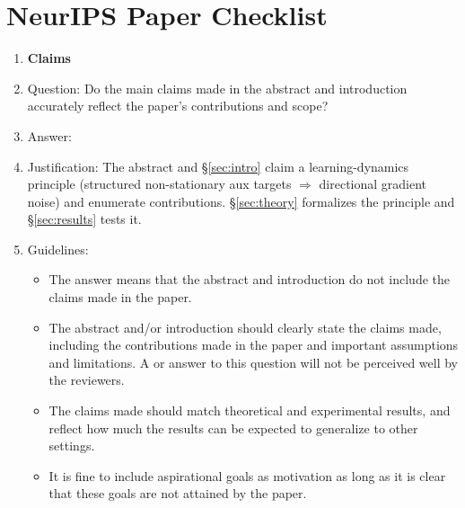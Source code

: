 \section*{NeurIPS Paper Checklist}

\begin{enumerate}

\item {\bf Claims}
    \item[] Question: Do the main claims made in the abstract and introduction accurately reflect the paper's contributions and scope?
    \item[] Answer: \answerYes{}
    \item[] Justification: The abstract and \S\ref{sec:intro} claim a learning-dynamics principle (structured non-stationary aux targets $\Rightarrow$ directional gradient noise) and enumerate contributions. \S\ref{sec:theory} formalizes the principle and \S\ref{sec:results} tests it.
    \item[] Guidelines:
    \begin{itemize}
        \item The answer \answerNA{} means that the abstract and introduction do not include the claims made in the paper.
        \item The abstract and/or introduction should clearly state the claims made, including the contributions made in the paper and important assumptions and limitations. A \answerNo{} or \answerNA{} answer to this question will not be perceived well by the reviewers.
        \item The claims made should match theoretical and experimental results, and reflect how much the results can be expected to generalize to other settings.
        \item It is fine to include aspirational goals as motivation as long as it is clear that these goals are not attained by the paper.
    \end{itemize}


\end{enumerate}
